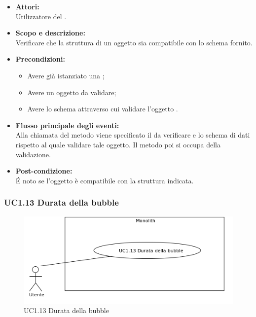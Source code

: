 \begin{itemize}
	\item \textbf{Attori:}
	\\Utilizzatore del .
	\item \textbf{Scopo e descrizione:} 
	\\Verificare che la struttura di un oggetto  sia compatibile con lo schema fornito.
	\item \textbf{Precondizioni:}
	\begin{itemize}
		\item Avere già istanziato una ;
		\item Avere un oggetto  da validare;
		\item Avere lo schema attraverso cui validare l’oggetto .
	\end{itemize}
	\item \textbf{Flusso principale degli eventi:}
	\\Alla chiamata del metodo viene specificato il  da verificare e lo schema di dati rispetto al quale validare tale oggetto. Il metodo poi si occupa della validazione.
	\item \textbf{Post-condizione:}
	\\É noto se l'oggetto  è compatibile con la struttura indicata.
\end{itemize}

\subsubsection{UC1.13 Durata della bubble} \label{UC1.13}

\begin{figure}[H]
	\centering
	\includegraphics[width=15cm]{../../documenti/AnalisiDeiRequisiti/Diagrammi_img/uc1_13.png}
	\caption{UC1.13 Durata della bubble}
\end{figure}

